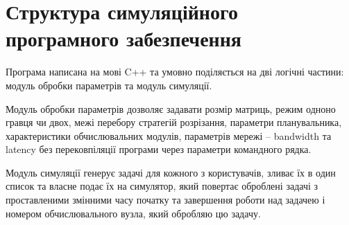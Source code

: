 
\section{Структура симуляційного програмного забезпечення}

Програма написана   на мові C++ та умовно поділяється на дві логічні частини: модуль обробки параметрів та модуль симуляції.

Модуль обробки параметрів дозволяє задавати розмір матриць, режим одноно гравця чи двох, межі перебору стратегій розрізання, параметри планувальника, характеристики обчислювальних модулів, параметрів мережі – bandwidth та latency без перековпіляції програми через параметри командного рядка.

Модуль симуляції генерує задачі для кожного з користувачів, зливає їх в один список та власне подає їх на симулятор, який повертає оброблені задачі з проставленими змінними часу початку та завершення роботи над задачею і номером обчислювального вузла, який обробляю цю  задачу.


